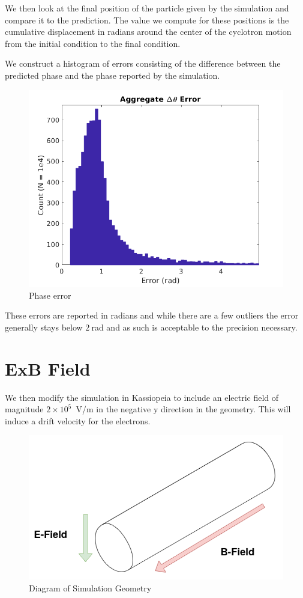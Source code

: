 \documentclass[12pt,letterpaper]{article}
\begin{document}
We then look at the final position of the particle given by the simulation and compare it to the prediction. The value we compute for these positions is the cumulative displacement in radians around the center of the cyclotron motion from the initial condition to the final condition. 

We construct a histogram of errors consisting of the difference between the predicted phase and the phase reported by the simulation.

    \begin{figure}[H]
    \centering
    \includegraphics[width=0.7\linewidth]{img/phase.png}
    \caption{Phase error}
    \end{figure}
    
These errors are reported in radians and while there are a few outliers the error generally stays below $2~$rad and as such is acceptable to the precision necessary.

\section{ExB Field}

We then modify the simulation in Kassiopeia to include an electric field of magnitude $2\times10^5$~V/m in the negative y direction in the geometry. This will induce a drift velocity for the electrons.

    \begin{figure}[H]
    \centering
    \includegraphics[width=0.8\linewidth]{img/CRES.png}
    \caption{Diagram of Simulation Geometry}
    \end{figure}
\end{document}
